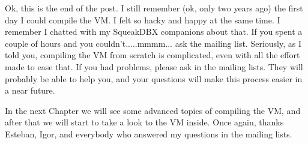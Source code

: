 \documentclass[a4paper,10pt,twoside]{book}
\begin{document}
Ok, this is the end of the post. I still remember (ok, only two years ago) the first day I could compile the VM. I felt so hacky and happy at the same time. I remember I chatted with my SqueakDBX companions about that. If you spent a couple of hours and you couldn't.....mmmm... ask the mailing list. Seriously, as I told you, compiling the VM from scratch is complicated, even with all the effort made to ease that. If you had problems, please ask in the mailing lists. They will probably be able to help you, and your questions will make this process easier in a near future.

In the next Chapter we will see some advanced topics of compiling the VM, and after that we will start to take a look to the VM inside. Once again, thanks Esteban, Igor, and everybody who answered my questions in the mailing lists.


\ifx\wholebook\relax\else
   
   
\end{document}
